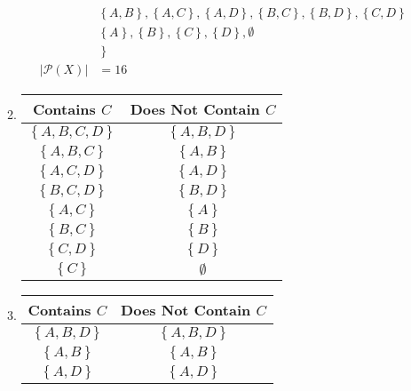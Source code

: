\documentclass{article}
\begin{document}
\begin{enumerate}[label = \textbf{\alph*)}]
\begin{enumerate}[label = \textbf{\alph*)}]
\begin{align*}
			                             & \left\{ A, B \right\}, \left\{ A, C \right\}, \left\{ A, D \right\}, \left\{ B, C \right\}, \left\{ B, D \right\}, \left\{ C, D \right\} \\
			                             & \left\{ A \right\}, \left\{ B \right\}, \left\{ C \right\}, \left\{ D \right\}, \emptyset                                                \\
			                             & \left. \right\}                                                                                                                          \\
			            |\mathcal{P}(X)| & = 16
		            \end{align*}
		      \item
		            \begin{tabular}{ | c | c | }
			            Contains $ C $                  & Does Not Contain $ C $       \\
			            \hline
			            $ \left\{ A, B, C, D \right\} $ & $ \left\{ A, B, D \right\} $ \\
			            $ \left\{ A, B, C \right\} $    & $ \left\{ A, B \right\} $    \\
			            $ \left\{ A, C, D \right\} $    & $ \left\{ A, D \right\} $    \\
			            $ \left\{ B, C, D \right\} $    & $ \left\{ B, D \right\} $    \\
			            $ \left\{ A, C \right\} $       & $ \left\{ A \right\} $       \\
			            $ \left\{ B, C \right\} $       & $ \left\{ B \right\} $       \\
			            $ \left\{ C, D \right\} $       & $ \left\{ D \right\} $       \\
			            $ \left\{ C \right\} $          & $ \emptyset $
		            \end{tabular}
		      \item
		            \begin{tabular}{ | c | c | }
			            Contains $ C $                                & Does Not Contain $ C $       \\
			            \hline
			            $ \left\{ A, B, D \right\} $                  & $ \left\{ A, B, D \right\} $ \\
			            $ \left\{ A, B \right\} $                     & $ \left\{ A, B \right\} $    \\
			            $ \left\{ A, D \right\} $                     & $ \left\{ A, D \right\} $    \\

\end{tabular}
\end{enumerate}
\end{enumerate}
\end{document}
